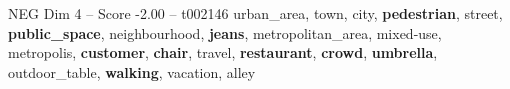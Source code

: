 \begin{textsample}{NEG Dim 4 – Score -2.00 – t002146}  \label{ex:f4_neg_030}
urban\_area, town, city, \textbf{pedestrian}, street, \textbf{public\_space}, neighbourhood, \textbf{jeans}, metropolitan\_area, mixed-use, metropolis, \textbf{customer}, \textbf{chair}, travel, \textbf{restaurant}, \textbf{crowd}, \textbf{umbrella}, outdoor\_table, \textbf{walking}, vacation, alley

\end{textsample}
